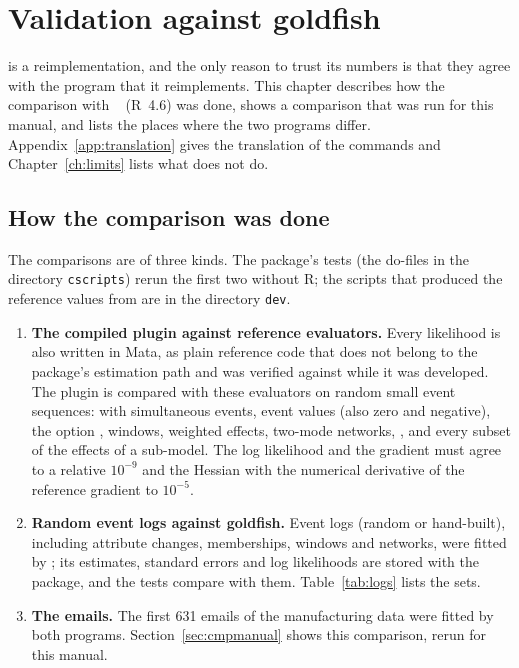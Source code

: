 \chapter{Validation against goldfish}\label{ch:validation}

\nwdynam{} is a reimplementation, and the only reason to trust its numbers is that they agree with the program that it reimplements. This chapter describes how the comparison with \goldfish{}~\gfver{} (R~4.6) was done, shows a comparison that was run for this manual, and lists the places where the two programs differ. Appendix~\ref{app:translation} gives the translation of the commands and Chapter~\ref{ch:limits} lists what \nwdynam{} does not do.

\section{How the comparison was done}\label{sec:howvalidated}

The comparisons are of three kinds. The package's tests (the do-files in the directory \texttt{cscripts}) rerun the first two without R; the scripts that produced the reference values from \goldfish{} are in the directory \texttt{dev}.

\begin{enumerate}[nosep]
  \item \textbf{The compiled plugin against reference evaluators.} Every likelihood is also written in Mata, as plain reference code that does not belong to the package's estimation path and was verified against \goldfish{} while it was developed. The plugin is compared with these evaluators on random small event sequences: with simultaneous events, event values (also zero and negative), the option , windows, weighted effects, two-mode networks, ,  and every subset of the effects of a sub-model. The log likelihood and the gradient must agree to a relative $10^{-9}$ and the Hessian with the numerical derivative of the reference gradient to $10^{-5}$.
  \item \textbf{Random event logs against goldfish.} Event logs (random or hand-built), including attribute changes, memberships, windows and networks, were fitted by \goldfish{}; its estimates, standard errors and log likelihoods are stored with the package, and the tests compare \nwdynam{} with them. Table~\ref{tab:logs} lists the sets.
  \item \textbf{The emails.} The first 631 emails of the manufacturing data were fitted by both programs. Section~\ref{sec:cmpmanual} shows this comparison, rerun for this manual.
\end{enumerate}

